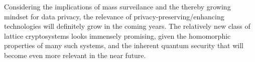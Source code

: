 Considering the implications of mass surveilance and the thereby growing mindset for data privacy, the relevance of privacy-preserving/enhancing technologies will definitely grow in the coming years.
The relatively new class of lattice cryptosystems looks immensely promising, given the homomorphic properties of many such systems, and the inherent quantum security that will become even more relevant in the near future.
